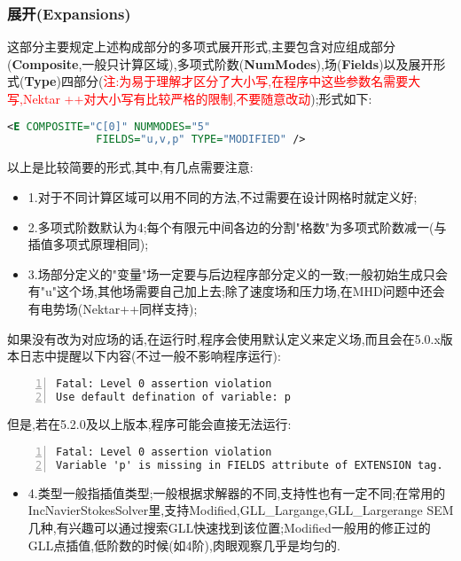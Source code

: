 \subsubsection{展开(Expansions)}

这部分主要规定上述构成部分的多项式展开形式,主要包含对应组成部分(\textbf{Composite},一般只计算区域),多项式阶数(\textbf{NumModes}),场(\textbf{Fields})以及展开形式(\textbf{Type})四部分(\textcolor{red}{注:为易于理解才区分了大小写,在程序中这些参数名需要大写,Nektar ++对大小写有比较严格的限制,不要随意改动});形式如下:
\par
\begin{lstlisting}[frame=single,language=XML]
   <E COMPOSITE="C[0]" NUMMODES="5" 
	          FIELDS="u,v,p" TYPE="MODIFIED" />
\end{lstlisting}
\par
以上是比较简要的形式,其中,有几点需要注意:
\begin{itemize}
\item{1.对于不同计算区域可以用不同的方法,不过需要在设计网格时就定义好;}
\item{2.多项式阶数默认为4;每个有限元中间各边的分割"格数"为多项式阶数减一(与插值多项式原理相同);}
\item{3.场部分定义的"变量"场一定要与后边程序部分定义的一致;一般初始生成只会有"u"这个场,其他场需要自己加上去;除了速度场和压力场,在MHD问题中还会有电势场(Nektar++同样支持);}
\end{itemize}
\par
如果没有改为对应场的话,在运行时,程序会使用默认定义来定义场,而且会在5.0.x版本日志中提醒以下内容(不过一般不影响程序运行):
\begin{lstlisting}[frame=single,numbers=left]
Fatal: Level 0 assertion violation
Use default defination of variable: p
\end{lstlisting}
\par
但是,若在5.2.0及以上版本,程序可能会直接无法运行:
\begin{lstlisting}[frame=single,numbers=left]
Fatal: Level 0 assertion violation
Variable 'p' is missing in FIELDS attribute of EXTENSION tag.
\end{lstlisting}
\par

\begin{itemize}
\item{4.类型一般指插值类型;一般根据求解器的不同,支持性也有一定不同;在常用的IncNavierStokesSolver里,支持Modified,GLL\_Largange,GLL\_Largerange SEM几种,有兴趣可以通过搜索GLL快速找到该位置;Modified一般用的修正过的GLL点插值,低阶数的时候(如4阶),肉眼观察几乎是均匀的.}
\end{itemize}

